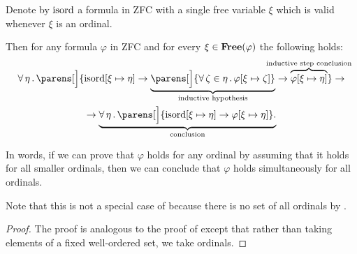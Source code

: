 \begin{theorem}\label{thm:transfinite_induction}
  Denote by \( \operatorname{isord} \) a formula in ZFC with a single free variable \( \xi \) which is valid whenever \( \xi \) is an ordinal.

  Then for any formula \( \varphi \) in ZFC and for every \( \xi \in \operatorname{\mathbf{Free}}(\varphi) \) the following holds:
  \begin{multline}\label{eq:def:transfinite_induction}
    \qforall \eta \parens[\Big]
      {
        \op{isord}[\xi \mapsto \eta] \rightarrow
          \underbrace
            {
              \parens[\Big] { \qforall {\zeta \in \eta} \varphi[\xi \mapsto \zeta] }
            }_{\T{inductive hypothesis}}
        \rightarrow
        \overbrace{ \varphi[\xi \mapsto \eta] }^{\mathclap{\T{inductive step conclusion}}}
      }
    \rightarrow \\ \rightarrow
    \underbrace
      {
        \qforall \eta \parens[\Big] { \op{isord}[\xi \mapsto \eta] \rightarrow \varphi[\xi \mapsto \eta] }.
      }_{\T{conclusion}}
  \end{multline}

  In words, if we can prove that \( \varphi \) holds for any ordinal by assuming that it holds for all smaller ordinals, then we can conclude that \( \varphi \) holds simultaneously for all ordinals.

  Note that this is not a special case of  because there is no set of all ordinals by .
\end{theorem}
\begin{proof}
  The proof is analogous to the proof of  except that rather than taking elements of a fixed well-ordered set, we take ordinals.
\end{proof}

